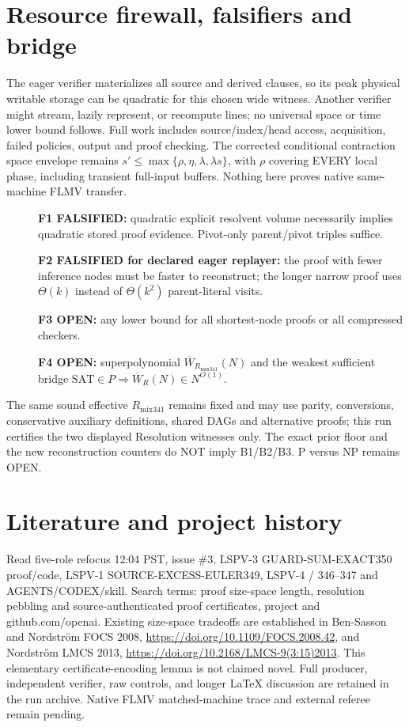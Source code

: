 \documentclass[11pt]{article}
\begin{document}
\section*{Resource firewall, falsifiers and bridge}
The eager verifier materializes all source and derived clauses, so its peak physical writable storage can be quadratic for this chosen wide witness. Another verifier might stream, lazily represent, or recompute lines; no universal space or time lower bound follows. Full work includes source/index/head access, acquisition, failed policies, output and proof checking. The corrected conditional contraction space envelope remains $s'\le\max\{\rho,\eta,\lambda,\lambda s\}$, with $\rho$ covering EVERY local phase, including transient full-input buffers. Nothing here proves native same-machine FLMV transfer.

\begin{description}
\item[] \textbf{F1 FALSIFIED:} quadratic explicit resolvent volume necessarily implies quadratic stored proof evidence. Pivot-only parent/pivot triples suffice.
\item[] \textbf{F2 FALSIFIED for declared eager replayer:} the proof with fewer inference nodes must be faster to reconstruct; the longer narrow proof uses $\Theta(k)$ instead of $\Theta(k^2)$ parent-literal visits.
\item[] \textbf{F3 OPEN:} any lower bound for all shortest-node proofs or all compressed checkers.
\item[] \textbf{F4 OPEN:} superpolynomial $\overline W_{R_{\mathrm{mix341}}}(N)$ and the weakest sufficient bridge $\mathrm{SAT}\in P\Rightarrow\overline W_R(N)\in N^{O(1)}$.
\end{description}
The same sound effective $R_{\mathrm{mix341}}$ remains fixed and may use parity, conversions, conservative auxiliary definitions, shared DAGs and alternative proofs; this run certifies the two displayed Resolution witnesses only. The exact prior floor and the new reconstruction counters do NOT imply B1/B2/B3. P versus NP remains OPEN.

\section*{Literature and project history}
Read five-role refocus 12:04 PST, issue \#3, LSPV-3 GUARD-SUM-EXACT350 proof/code, LSPV-1 SOURCE-EXCESS-EULER349, LSPV-4 / 346--347 and AGENTS/CODEX/skill. Search terms: proof size-space length, resolution pebbling and source-authenticated proof certificates, project and github.com/openai. Existing size-space tradeoffs are established in Ben-Sasson and Nordstr\"om FOCS 2008, \url{https://doi.org/10.1109/FOCS.2008.42}, and Nordstr\"om LMCS 2013, \url{https://doi.org/10.2168/LMCS-9(3:15)2013}. This elementary certificate-encoding lemma is not claimed novel. Full producer, independent verifier, raw controls, and longer LaTeX discussion are retained in the run archive. Native FLMV matched-machine trace and external referee remain pending.
\end{document}
